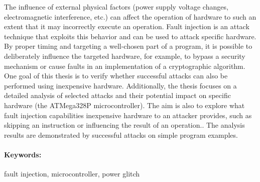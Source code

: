 \documentclass[12pt, twoside]{book}
\begin{document}
The influence of external physical factors (power supply voltage changes, electromagnetic interference, etc.) can affect the operation of hardware to such an extent that it may incorrectly execute an operation. Fault injection is an attack technique that exploits this behavior and can be used to attack specific hardware. By proper timing and targeting a well-chosen part of a program, it is possible to deliberately influence the targeted hardware, for example, to bypass a security mechanism or cause faults in an implementation of a cryptographic algorithm. One goal of this thesis is to verify whether successful attacks can also be performed using inexpensive hardware. Additionally, the thesis focuses on a detailed analysis of selected attacks and their potential impact on specific hardware (the ATMega328P microcontroller). The aim is also to explore what fault injection capabilities inexpensive hardware to an attacker provides, such as skipping an instruction or influencing the result of an operation.. The analysis results are demonstrated by successful attacks on simple program examples.


\paragraph*{Keywords:} fault injection, microcontroller, power glitch


%
%
%


\newpage 

\tableofcontents


\newpage 

\listoffigures
\listoftables


\mainmatter
\pagestyle{headings}
\end{document}
